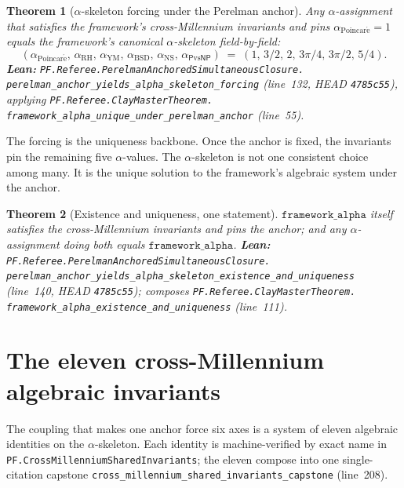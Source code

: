 \documentclass[11pt,a4paper]{article}
\theoremstyle{plain}
\newtheorem{theorem}{Theorem}[section]
\theoremstyle{definition}
\begin{document}
\begin{theorem}[$\alpha$-skeleton forcing under the Perelman anchor]
\label{thm:alpha-forcing}
Any $\alpha$-assignment that satisfies the framework's
cross-Millennium invariants and pins $\alpha_{\mathrm{Poincar\acute e}}
= 1$ equals the framework's canonical $\alpha$-skeleton
field-by-field:
\[
(\alpha_{\mathrm{Poincar\acute e}},\, \alpha_{\mathrm{RH}},\,
\alpha_{\mathrm{YM}},\, \alpha_{\mathrm{BSD}},\,
\alpha_{\mathrm{NS}},\, \alpha_{\mathsf{P}\mathrm{vs}\mathsf{NP}})
\;=\;
(1,\, 3/2,\, 2,\, 3\pi/4,\, 3\pi/2,\, 5/4).
\]
\textbf{Lean:}
\texttt{PF.Referee.PerelmanAnchoredSimultaneousClosure.\\
perelman\_anchor\_yields\_alpha\_skeleton\_forcing}
(line~132, HEAD \texttt{4785c55}),
applying
\texttt{PF.Referee.ClayMasterTheorem.\\
framework\_alpha\_unique\_under\_perelman\_anchor}
(line~55).
\end{theorem}

The forcing is the uniqueness backbone. Once the anchor is fixed,
the invariants pin the remaining five $\alpha$-values. The
$\alpha$-skeleton is not one consistent choice among many. It is the
unique solution to the framework's algebraic system under the
anchor.

\begin{theorem}[Existence and uniqueness, one statement]
\label{thm:alpha-existence-uniqueness}
$\mathtt{framework\_alpha}$ itself satisfies the cross-Millennium
invariants and pins the anchor; and any $\alpha$-assignment doing
both equals $\mathtt{framework\_alpha}$.
\textbf{Lean:}
\texttt{PF.Referee.PerelmanAnchoredSimultaneousClosure.\\
perelman\_anchor\_yields\_alpha\_skeleton\_existence\_and\_uniqueness}
(line~140, HEAD \texttt{4785c55}); composes
\texttt{PF.Referee.ClayMasterTheorem.\\
framework\_alpha\_existence\_and\_uniqueness}
(line~111).
\end{theorem}

\section{The eleven cross-Millennium algebraic invariants}
\label{sec:invariants}

The coupling that makes one anchor force six axes is a system of
eleven algebraic identities on the $\alpha$-skeleton. Each identity
is machine-verified by exact name in
\texttt{PF.CrossMillenniumSharedInvariants}; the eleven compose into
one single-citation capstone
\texttt{cross\_millennium\_shared\_invariants\_capstone}
(line~208).
\end{document}
